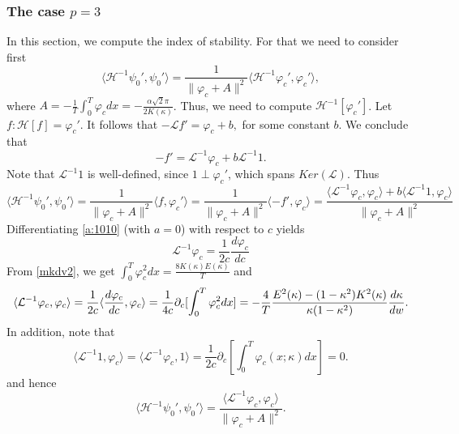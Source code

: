 \documentclass[final,11pt,leqno]{amsart}
\begin{document}
\subsubsection{The case $p=3$}
In this section,  we compute the index of stability.  For that we need to consider first
$$
{\langle {{\mathcal H}^{-1} \psi_0'},{\psi_0'} \rangle}=\frac{1}{\|\varphi_c+A\|^2}{\langle {{\mathcal H}^{-1} {\varphi}_c'},{{\varphi}_c'} \rangle},
$$
where $A=-{\frac{1}{T}}\int_{0}^{T}{\varphi_c}dx=-{\frac{\alpha\sqrt{2}\pi}{2K(\kappa)}}$. Thus, we need to compute ${\mathcal H}^{-1}[{\varphi}_c']$.
Let $f: {\mathcal H}[f]={\varphi}_c'$. It follows that
$
-{\mathcal L} f'={\varphi}_c+b,
$
for some constant $b$.  We conclude that
$$
-f'={\mathcal L}^{-1} {\varphi}_c+b {\mathcal L}^{-1} 1.
$$
Note that ${\mathcal L}^{-1} 1$ is well-defined, since $1\perp {\varphi}_c'$, which spans $Ker({\mathcal L})$.
Thus
\begin{equation}
\label{350}
{\langle {{\mathcal H}^{-1} \psi_0'},{\psi_0'} \rangle}=\frac{1}{\|\varphi_c+A\|^2} {\langle {f},{{\varphi}_c'} \rangle}=
\frac{1}{\|\varphi_c+A\|^2} {\langle {-f'},{{\varphi}_c} \rangle}=
\frac{{\langle {{\mathcal L}^{-1}{\varphi}_c},{{\varphi}_c} \rangle}+b{\langle {{\mathcal L}^{-1} 1},{{\varphi}_c} \rangle}}{\|\varphi_c+A\|^2}
\end{equation}
  Differentiating  \eqref{a:1010} (with $a=0$)  with respect to $c$ yields
    \begin{equation}\label{mkdv5}
        \mathcal{L}^{-1}\varphi_c={\frac{1}{2c}}{\frac{d\varphi_c}{dc}}
    \end{equation}
From \eqref{mkdv2}, we get $\int_{0}^{T}{{\varphi}_c^2}dx={\frac{8K(\kappa)E(\kappa)}{T}}$ and
     \begin{equation}
     \label{mkdv6}
       \langle \mathcal{L}^{-1}\varphi_c, \varphi_c\rangle ={\frac{1}{2c}}\langle \frac{d\varphi_c}{dc},
       \varphi_c\rangle={\frac{1}{4c}}{\partial}_c[\int_{0}^{T}{\varphi_c^2}dx] \\
       =-{\frac{4}{T}}{\frac{E^2(\kappa)-(1-\kappa^2)K^2(\kappa)}{\kappa
       (1-\kappa^2)}}{\frac{d\kappa}{dw}}.
     \end{equation}
     In addition, note that
     $$
             {\langle {{\mathcal L}^{-1} 1},{{\varphi}_c} \rangle}= \langle \mathcal{L}^{-1}\varphi_c, 1\rangle
              ={\frac{1}{2c}}
              {\partial}_c[\int_{0}^{T}{\varphi_c(x;\kappa)}dx]=0.
         $$
         and hence
         $$
         {\langle {{\mathcal H}^{-1} \psi_0'},{\psi_0'} \rangle}=\frac{{\langle {{\mathcal L}^{-1}{\varphi}_c},{{\varphi}_c} \rangle}}{\|\varphi_c+A\|^2}.
         $$
\end{document}
